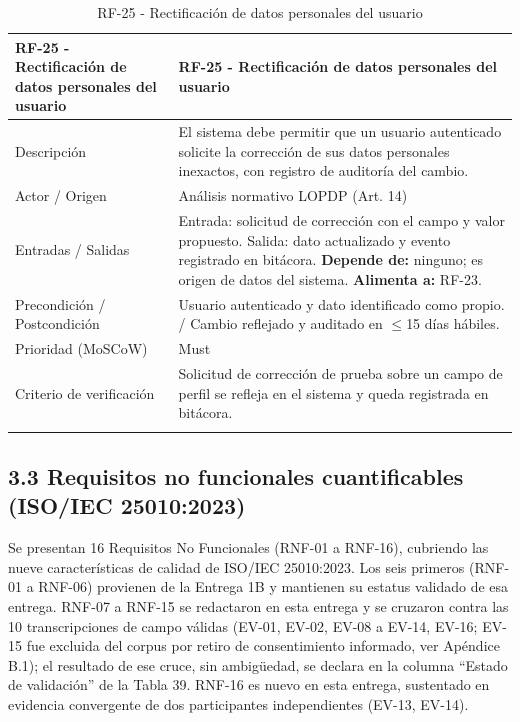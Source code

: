 \begingroup
\small
\begin{longtable}{|P{0.5000}|P{0.5000}|}
\hline
RF-25 - Rectificación de datos personales del usuario & RF-25 - Rectificación de datos personales del usuario \\ \hline
Descripción & El sistema debe permitir que un usuario autenticado solicite la corrección de sus datos personales inexactos, con registro de auditoría del cambio. \\ \hline
Actor / Origen & Análisis normativo LOPDP (Art. 14) \\ \hline
Entradas / Salidas & Entrada: solicitud de corrección con el campo y valor propuesto. Salida: dato actualizado y evento registrado en bitácora. \textbf{Depende de:} ninguno; es origen de datos del sistema. \textbf{Alimenta a:} RF-23. \\ \hline
Precondición / Postcondición & Usuario autenticado y dato identificado como propio. / Cambio reflejado y auditado en $\leq$15 días hábiles. \\ \hline
Prioridad (MoSCoW) & Must \\ \hline
Criterio de verificación & Solicitud de corrección de prueba sobre un campo de perfil se refleja en el sistema y queda registrada en bitácora. \\ \hline
\caption{RF-25 - Rectificación de datos personales del usuario}
\end{longtable}
\endgroup

\subsection*{3.3 Requisitos no funcionales cuantificables (ISO/IEC 25010:2023)}


Se presentan 16 Requisitos No Funcionales (RNF-01 a RNF-16), cubriendo las nueve características de calidad de ISO/IEC 25010:2023. Los seis primeros (RNF-01 a RNF-06) provienen de la Entrega 1B y mantienen su estatus validado de esa entrega. RNF-07 a RNF-15 se redactaron en esta entrega y se cruzaron contra las 10 transcripciones de campo válidas (EV-01, EV-02, EV-08 a EV-14, EV-16; EV-15 fue excluida del corpus por retiro de consentimiento informado, ver Apéndice B.1); el resultado de ese cruce, sin ambigüedad, se declara en la columna ``Estado de validación'' de la Tabla 39. RNF-16 es nuevo en esta entrega, sustentado en evidencia convergente de dos participantes independientes (EV-13, EV-14).


